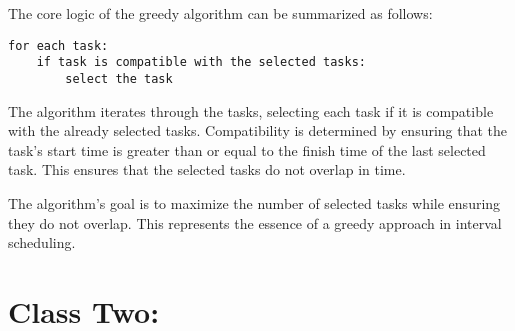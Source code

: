 \documentclass{article}
\begin{document}
The core logic of the greedy algorithm can be summarized as follows:

\begin{verbatim}
for each task:
    if task is compatible with the selected tasks:
        select the task
\end{verbatim}

The algorithm iterates through the tasks, selecting each task if it is compatible with the already selected tasks. Compatibility is determined by ensuring that the task's start time is greater than or equal to the finish time of the last selected task. This ensures that the selected tasks do not overlap in time.

The algorithm's goal is to maximize the number of selected tasks while ensuring they do not overlap. This represents the essence of a greedy approach in interval scheduling.
\section{Class Two:}
\end{document}
